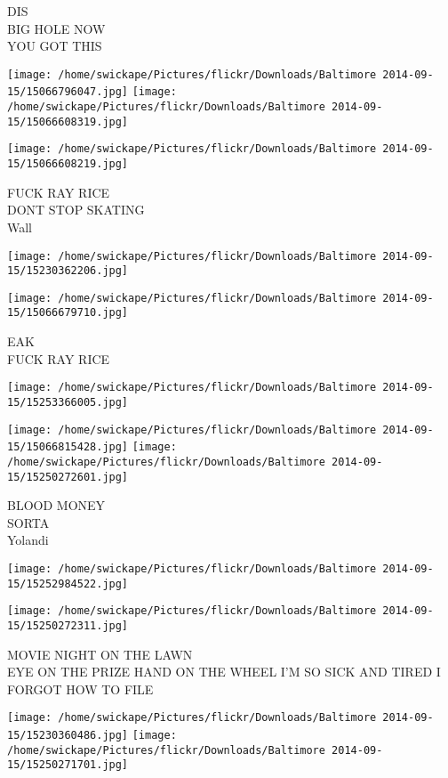 \documentclass[10pt,letterpaper]{article}
\begin{document}
DIS\\
BIG HOLE NOW\\
YOU GOT THIS
\pagebreak

\texttt{[image: /home/swickape/Pictures/flickr/Downloads/Baltimore 2014-09-15/15066796047.jpg]}
\texttt{[image: /home/swickape/Pictures/flickr/Downloads/Baltimore 2014-09-15/15066608319.jpg]}

\vspace{0.25in}
\texttt{[image: /home/swickape/Pictures/flickr/Downloads/Baltimore 2014-09-15/15066608219.jpg]}

FUCK RAY RICE\\
DONT STOP SKATING\\
Wall
\pagebreak

\texttt{[image: /home/swickape/Pictures/flickr/Downloads/Baltimore 2014-09-15/15230362206.jpg]}

\vspace{0.25in}
\texttt{[image: /home/swickape/Pictures/flickr/Downloads/Baltimore 2014-09-15/15066679710.jpg]}

EAK\\
FUCK RAY RICE
\pagebreak

\texttt{[image: /home/swickape/Pictures/flickr/Downloads/Baltimore 2014-09-15/15253366005.jpg]}

\vspace{0.25in}
\texttt{[image: /home/swickape/Pictures/flickr/Downloads/Baltimore 2014-09-15/15066815428.jpg]}
\texttt{[image: /home/swickape/Pictures/flickr/Downloads/Baltimore 2014-09-15/15250272601.jpg]}

BLOOD MONEY\\
SORTA\\
Yolandi
\pagebreak

\texttt{[image: /home/swickape/Pictures/flickr/Downloads/Baltimore 2014-09-15/15252984522.jpg]}

\vspace{0.25in}
\texttt{[image: /home/swickape/Pictures/flickr/Downloads/Baltimore 2014-09-15/15250272311.jpg]}

MOVIE NIGHT ON THE LAWN\\
EYE ON THE PRIZE HAND ON THE WHEEL I'M SO SICK AND TIRED I FORGOT HOW TO FILE
\pagebreak

\texttt{[image: /home/swickape/Pictures/flickr/Downloads/Baltimore 2014-09-15/15230360486.jpg]}
\texttt{[image: /home/swickape/Pictures/flickr/Downloads/Baltimore 2014-09-15/15250271701.jpg]}
\end{document}
